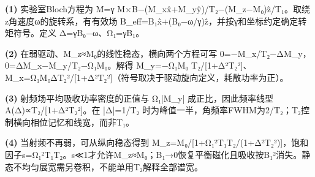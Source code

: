 \par\noindent\textbf{(1)} 实验室Bloch方程为 Ṁ=γ M×B−(M\_xx̂+M\_yŷ)/T₂−(M\_z−M₀)ẑ/T₁。取绕z角速度ω的旋转系，有有效场 B\_eff=B₁x̂+(B₀−ω/γ)ẑ，并按γ和坐标约定确定转矩符号。定义 Δ=γB₀−ω、Ω₁=γB₁。
\par\noindent\textbf{(2)} 在弱驱动、M\_z≈M₀的线性稳态，横向两个方程可写 0=−M\_x/T₂−ΔM\_y，0=ΔM\_x−M\_y/T₂−Ω₁M₀。解得 M\_y=−Ω₁M₀ T₂/[1+Δ²T₂²]、M\_x=Ω₁M₀ΔT₂²/[1+Δ²T₂²]（符号取决于驱动旋向定义，耗散功率为正）。
\par\noindent\textbf{(3)} 射频场平均吸收功率密度的正值与 Ω₁|M\_y| 成正比，因此频率线型 A(Δ)∝T₂/[1+Δ²T₂²]。在 |Δ|=1/T₂ 时为峰值一半，角频率FWHM为2/T₂；T₂控制横向相位记忆和线宽，而非T₁。
\par\noindent\textbf{(4)} 当射频不再弱，可从纵向稳态得到 M\_z=M₀/[1+Ω₁²T₁T₂/(1+Δ²T₂²)]，饱和因子s=Ω₁²T₁T₂。s≪1才允许M\_z≈M₀；B₁→0恢复平衡磁化且吸收按B₁²消失。静态不均匀展宽需另卷积，不能单用T₂解释全部谱宽。
